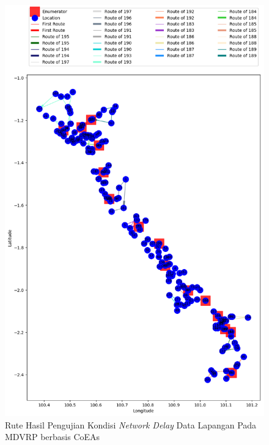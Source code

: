 \begin{figure}[H]
	\centering
	\includegraphics[width=\textwidth]{Resources/Images/test_result_normal_field_m15_n182_delay_coes}
	\caption{Rute Hasil Pengujian Kondisi \textit{Network Delay} Data Lapangan Pada MDVRP berbasis CoEAs}
	\label{fig:test_result_network_delay_field_coes}
\end{figure}


